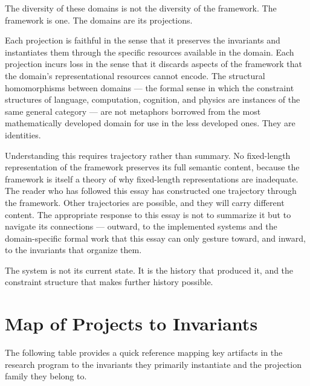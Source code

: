 \documentclass[12pt, twoside]{article}
\theoremstyle{plain}
\theoremstyle{definition}
\theoremstyle{remark}
\begin{document}
The diversity of these domains is not the diversity of the framework.
The framework is one.
The domains are its projections.

Each projection is faithful in the sense that it preserves the
invariants and instantiates them through the specific resources
available in the domain.
Each projection incurs loss in the sense that it discards aspects of
the framework that the domain's representational resources cannot encode.
The structural homomorphisms between domains — the formal sense in which
the constraint structures of language, computation, cognition, and physics
are instances of the same general category — are not metaphors borrowed
from the most mathematically developed domain for use in the less
developed ones.
They are identities.

Understanding this requires trajectory rather than summary.
No fixed-length representation of the framework preserves its full
semantic content, because the framework is itself a theory of
why fixed-length representations are inadequate.
The reader who has followed this essay has constructed one trajectory
through the framework.
Other trajectories are possible, and they will carry different content.
The appropriate response to this essay is not to summarize it
but to navigate its connections — outward, to the implemented systems
and the domain-specific formal work that this essay can only gesture toward,
and inward, to the invariants that organize them.

The system is not its current state.
It is the history that produced it, and the constraint structure
that makes further history possible.

\vfill

\appendix
\section{Map of Projects to Invariants}

The following table provides a quick reference mapping key artifacts
in the research program to the invariants they primarily instantiate
and the projection family they belong to.
\end{document}
